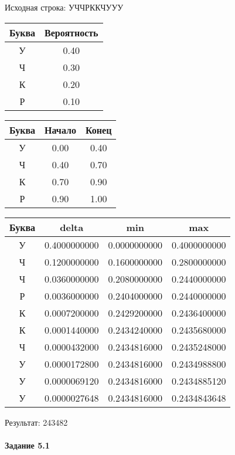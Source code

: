 \documentclass[a4paper, 12pt]{article}
\begin{document}
Исходная строка: УЧЧРККЧУУУ\
\begin{center}
 \begin{tabular}{ |c|c| } 
  \hline
     Буква & Вероятность \\ \hline
У & 0.40\\\hline
Ч & 0.30\\\hline
К & 0.20\\\hline
Р & 0.10
\\ \hline \end{tabular}
\end{center}
\begin{center}
 \begin{tabular}{ |c|c|c| } 
  \hline
     Буква & Начало & Конец \\ \hline
У & 0.00 & 0.40\\\hline
Ч & 0.40 & 0.70\\\hline
К & 0.70 & 0.90\\\hline
Р & 0.90 & 1.00
\\ \hline \end{tabular}
\end{center}
\begin{center}
 \begin{tabular}{ |c|c|c|c| } 
  \hline
     Буква & delta & min & max \\ \hline
У & 0.4000000000 & 0.0000000000 & 0.4000000000\\\hline
Ч & 0.1200000000 & 0.1600000000 & 0.2800000000\\\hline
Ч & 0.0360000000 & 0.2080000000 & 0.2440000000\\\hline
Р & 0.0036000000 & 0.2404000000 & 0.2440000000\\\hline
К & 0.0007200000 & 0.2429200000 & 0.2436400000\\\hline
К & 0.0001440000 & 0.2434240000 & 0.2435680000\\\hline
Ч & 0.0000432000 & 0.2434816000 & 0.2435248000\\\hline
У & 0.0000172800 & 0.2434816000 & 0.2434988800\\\hline
У & 0.0000069120 & 0.2434816000 & 0.2434885120\\\hline
У & 0.0000027648 & 0.2434816000 & 0.2434843648
\\ \hline \end{tabular}
\end{center}
Результат: 243482
\pagebreak
\paragraph{Задание 5.1 \\
}
\end{document}
